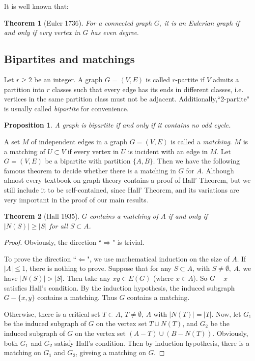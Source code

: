 \documentclass[12pt]{report}
\newtheorem{theorem}{Theorem}
\newtheorem{proposition}{Proposition}
\begin{document}
It is well known that:
\begin{theorem}[Euler 1736]
For a connected graph $G$, it is an Eulerian graph if and only if evry vertex in $G$ has even degree.
\end{theorem}



\subsection{Bipartites and matchings}

Let $r\ge2$ be an integer. A graph $G=(V,E)$ is called $r$-partite if $V$ admits a partition into $r$ classes such that every edge has its ends in different classes, i.e. vertices in the same partition class must not be adjacent. Additionally,``2-partite" is usually called {\em bipartite} for convenience.
\begin{proposition}\label{bipoefpro3}
A graph is bipartite if and only if it contains no odd cycle.
\end{proposition}

A set $M$ of independent edges in a graph $G=(V,E)$ is called a {\em matching}. 
$M$ is a matching of $U\subset V$ if every vertex in $U$ is incident with an edge in $M$.
Let $G=(V,E)$ be a bipartite with partition $\{A,B\}$. Then we have the following famous theorem to decide whether there is a matching in $G$ for $A$. Although almost every textbook on graph theory contains a proof of Hall' Theorem, but we still include it to be self-contained, since Hall' Theorem, and its variations are very important in the proof of our main results.
\begin{theorem}[Hall 1935]\label{hallori1th}
$G$ contains a matching of $A$ if and only if $|N(S)|\ge|S|$ for all $S\subset A$.
\end{theorem}
\begin{proof}
Obviously, the direction ``$\Rightarrow$" is trivial.

To prove the direction ``$\Leftarrow$", we use mathematical induction on the size of $A$.
If $|A|\le1$, there is nothing to prove.
Suppose that for any $S\subset A$, with $S\neq\emptyset,~A$, we have $|N(S)|>|S|$. Then take any $xy\in E(G)$ (where $x\in A$). So $G-x$ satisfies Hall's condition. By the induction hypothesis, the induced subgraph $G-\{x,y\}$ contains a matching. Thus $G$ contains a matching.

Otherwise, there is a critical set $T\subset A$, $T\neq\emptyset,~A$ with $|N(T)|=|T|$. Now, let $G_1$ be the induced subgraph of $G$ on the vertex set $T\cup N(T)$, and $G_2$ be the induced subgraph of $G$ on the vertex set $(A-T)\cup(B-N(T))$. Obviously, both $G_1$ and $G_2$ satisfy Hall's condition. Then by induction hypothesis, there is a matching on $G_1$ and $G_2$, giveing a matching on $G$.


\end{proof}
\end{document}
